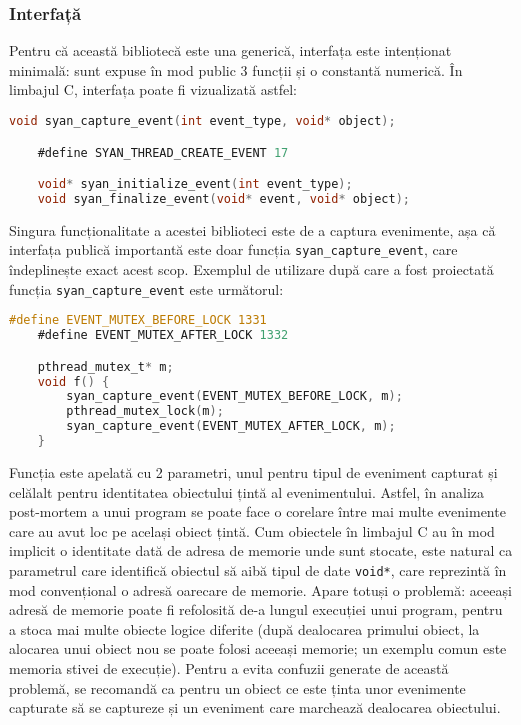 \subsubsection{Interfață}
Pentru că această bibliotecă este una generică, interfața este
intenționat minimală: sunt expuse în mod public 3 funcții și o constantă
numerică. În limbajul C, interfața poate fi vizualizată astfel:
\begin{lstlisting}[language=C]
    void syan_capture_event(int event_type, void* object);

    #define SYAN_THREAD_CREATE_EVENT 17

    void* syan_initialize_event(int event_type);
    void syan_finalize_event(void* event, void* object);
\end{lstlisting}
Singura funcționalitate a acestei biblioteci este de a captura
evenimente, așa că interfața publică importantă este doar funcția
\lstinline{syan_capture_event}, care îndeplinește exact acest scop.
Exemplul de utilizare după care a fost proiectată funcția
\lstinline{syan_capture_event} este următorul:
\begin{lstlisting}[language=C]
    #define EVENT_MUTEX_BEFORE_LOCK 1331
    #define EVENT_MUTEX_AFTER_LOCK 1332

    pthread_mutex_t* m;
    void f() {
        syan_capture_event(EVENT_MUTEX_BEFORE_LOCK, m);
        pthread_mutex_lock(m);
        syan_capture_event(EVENT_MUTEX_AFTER_LOCK, m);
    }
\end{lstlisting}
Funcția este apelată cu 2 parametri, unul pentru tipul de eveniment
capturat și celălalt pentru identitatea obiectului țintă al
evenimentului. Astfel, în analiza post-mortem a unui program se poate
face o corelare între mai multe evenimente care au avut loc pe același
obiect țintă. Cum obiectele în limbajul C au în mod implicit o
identitate dată de adresa de memorie unde sunt stocate, este natural ca
parametrul care identifică obiectul să aibă tipul de date
\lstinline{void*}, care reprezintă în mod convențional o adresă oarecare
de memorie. Apare totuși o problemă: aceeași adresă de memorie poate fi
refolosită de-a lungul execuției unui program, pentru a stoca mai multe
obiecte logice diferite (după dealocarea primului obiect, la alocarea
unui obiect nou se poate folosi aceeași memorie; un exemplu comun este
memoria stivei de execuție). Pentru a evita confuzii generate de această
problemă, se recomandă ca pentru un obiect ce este ținta unor evenimente
capturate să se captureze și un eveniment care marchează dealocarea
obiectului.

